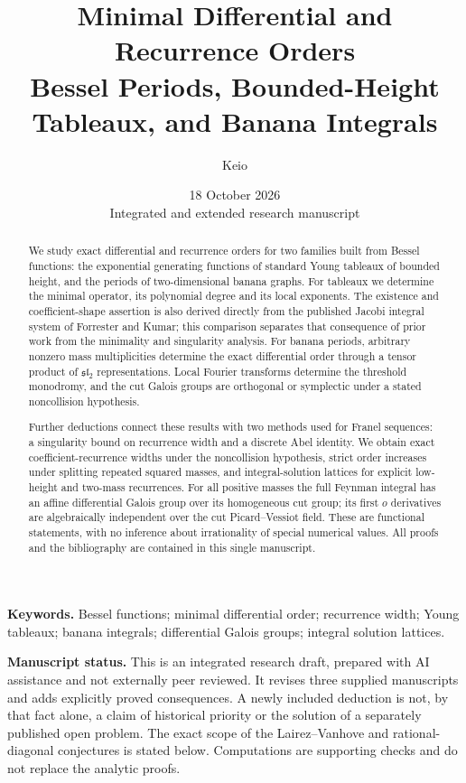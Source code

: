 \documentclass[11pt,a4paper]{article}
\title{Minimal Differential and Recurrence Orders\\[3pt]
\large Bessel Periods, Bounded-Height Tableaux, and Banana Integrals}
\author{Keio}
\date{18 October 2026\\\small Integrated and extended research manuscript}
\theoremstyle{definition}
\theoremstyle{remark}
\numberwithin{equation}{section}
\begin{document}
\maketitle
\begin{abstract}
We study exact differential and recurrence orders for two families built from
Bessel functions: the exponential generating functions of standard Young
tableaux of bounded height, and the periods of two-dimensional banana graphs.
For tableaux we determine the minimal operator, its polynomial degree and its
local exponents. The existence and coefficient-shape assertion is also derived
directly from the published Jacobi integral system of Forrester and Kumar;
this comparison separates that consequence of prior work from the minimality
and singularity analysis. For banana periods, arbitrary nonzero mass
multiplicities determine the exact differential order through a tensor product
of $\mathfrak{sl}_2$ representations. Local Fourier transforms determine the
threshold monodromy, and the cut Galois groups are orthogonal or symplectic
under a stated noncollision hypothesis.

Further deductions connect these results with two methods used for Franel
sequences: a singularity bound on recurrence width and a discrete Abel
identity. We obtain exact coefficient-recurrence widths under the noncollision
hypothesis, strict order increases under splitting repeated squared masses,
and integral-solution lattices for explicit low-height and two-mass
recurrences. For all positive masses the full Feynman integral has an affine
differential Galois group over its homogeneous cut group; its first $o$
derivatives are algebraically independent over the cut Picard--Vessiot field.
These are functional statements, with no inference about irrationality of
special numerical values. All proofs and the bibliography are contained in
this single manuscript.
\end{abstract}

\noindent\textbf{Keywords.} Bessel functions; minimal differential order;
recurrence width; Young tableaux; banana integrals; differential Galois groups;
integral solution lattices.

\medskip
\noindent\textbf{Manuscript status.} This is an integrated research draft,
prepared with AI assistance and not externally peer reviewed. It revises three
supplied manuscripts and adds explicitly proved consequences. A newly included
deduction is not, by that fact alone, a claim of historical priority or the
solution of a separately published open problem. The exact scope of the
Lairez--Vanhove and rational-diagonal conjectures is stated below. Computations
are supporting checks and do not replace the analytic proofs.
\end{document}

